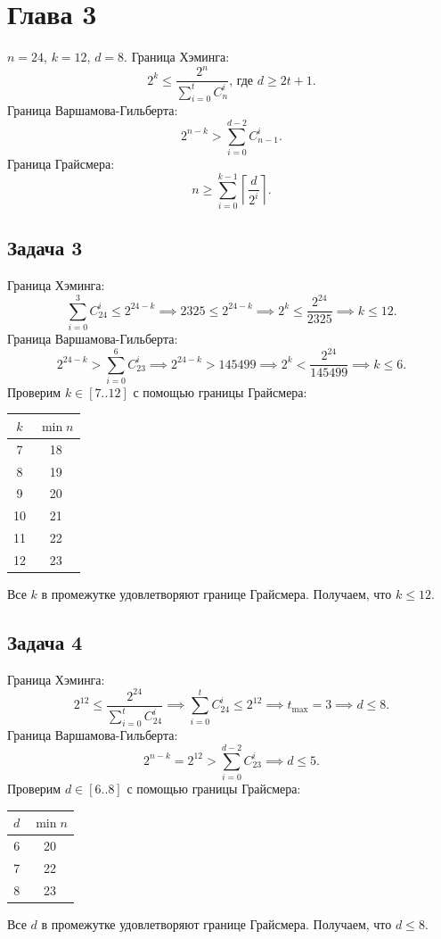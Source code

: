 \documentclass{article}
\begin{document}
\section{\texorpdfstring{Глава 3}{Section 3}}
$n = 24$, $k = 12$, $d = 8$.
Граница Хэминга:
\[
    2^k \leq \frac{2^n}{\sum_{i=0}^t C_n^i} \text{, где } d \geq 2t + 1\text{.}
\]
Граница Варшамова-Гильберта:
\[
    2^{n-k} > \sum_{i=0}^{d-2} C_{n-1}^i\text{.}
\]
Граница Грайсмера:
\[
    n \geq \sum_{i=0}^{k-1} \left\lceil \frac{d}{2^i} \right\rceil\text{.}
\]

\subsection{\texorpdfstring{Задача 3}{Task 3}}
Граница Хэминга:
\[
    \sum_{i=0}^3 C_{24}^i \leq 2^{24-k} \implies 2325 \leq 2^{24-k} \implies
    2^k \leq \frac{2^{24}}{2325} \implies k \leq 12\text{.}
\]
Граница Варшамова-Гильберта:
\[
    2^{24-k} > \sum_{i=0}^6 C_{23}^i \implies 2^{24-k} > 145499 \implies
    2^k < \frac{2^{24}}{145499} \implies k \leq 6\text{.}
\]
Проверим $k \in [7..12]$ с помощью границы Грайсмера:
\begin{center}
    \begin{tabular}{c c}
        \toprule
        $k$ & $\min n$ \\ \midrule
        7  & 18 \\
        8  & 19 \\
        9  & 20 \\
        10 & 21 \\
        11 & 22 \\
        12 & 23 \\ \bottomrule
    \end{tabular}
\end{center}
Все $k$ в промежутке удовлетворяют границе Грайсмера.
Получаем, что $k \leq 12$.

\subsection{\texorpdfstring{Задача 4}{Task 4}}
Граница Хэминга:
\[
    2^{12} \leq \frac{2^{24}}{\sum_{i=0}^t C_{24}^i} \implies
    \sum_{i=0}^t C_{24}^i \leq 2^{12} \implies
    t_{\max} = 3 \implies d \leq 8 \text{.}
\]
Граница Варшамова-Гильберта:
\[
    2^{n-k} = 2^{12} > \sum_{i=0}^{d-2} C_{23}^i \implies d \leq 5\text{.}
\]
Проверим $d \in [6..8]$ с помощью границы Грайсмера:
\begin{center}
    \begin{tabular}{c c}
        \toprule
        $d$ & $\min n$ \\ \midrule
        6 & 20 \\
        7 & 22 \\
        8 & 23 \\ \bottomrule
    \end{tabular}
\end{center}
Все $d$ в промежутке удовлетворяют границе Грайсмера.
Получаем, что $d \leq 8$.
\end{document}

